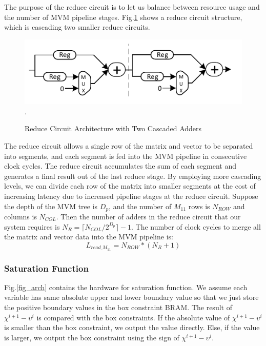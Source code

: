 The purpose of the reduce circuit is to let us balance between resource usage and the number of MVM pipeline stages. Fig.\cref{fig_red} shows a reduce circuit structure, which is cascading two smaller reduce circuits.\par
\begin{figure}[t]
\centering
\captionsetup{justification=centering}
\includegraphics[scale=0.9]{../figure/Reduce.pdf}
\DeclareGraphicsExtensions.
\caption{Reduce Circuit Architecture with Two Cascaded Adders\label{fig_red}}
\end{figure}
The reduce circuit allows a single row of the matrix and vector to be separated into segments, and each segment is fed into the MVM pipeline in consecutive clock cycles. The reduce circuit accumulates the sum of each segment and generates a final result out of the last reduce stage. By employing more cascading levels, we can divide each row of the matrix into smaller segments at the cost of increasing latency due to increased pipeline stages at the reduce circuit. Suppose the depth of the MVM tree is $D_p$, and the number of $M_{11}$ rows is $N_{ROW}$ and columns is $N_{COL}$. Then the number of adders in the reduce circuit that our system requires is $N_R=\lceil N_{COL}/2^{D_p}\rceil-1$. The number of clock cycles to merge all the matrix and vector data into the MVM pipeline is:
\begin{equation}
\label{eq:md}
L_{read\_ M_{11}}=N_{ROW}*(N_R+1)
\end{equation}

\subsubsection{Saturation Function}
Fig.\cref{fig_arch} contains the hardware for saturation function. We assume each variable has same absolute upper and lower boundary value so that we just store the positive boundary values in the box constraint BRAM. The result of $\chi^{i+1}-\upsilon^{i}$ is compared with the box constraints. If the absolute value of $\chi^{i+1}-\upsilon^{i}$ is smaller than the box constraint, we output the value directly. Else, if the value is larger, we output the box constraint using the sign of $\chi^{i+1}-\upsilon^{i}$.

